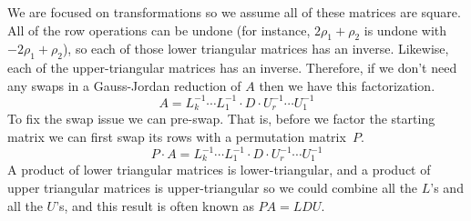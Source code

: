We are focused on transformations so we assume all of these
matrices are square.
All of the row operations can be undone (for instance, $2\rho_1+\rho_2$
is undone with $-2\rho_1+\rho_2$), so each of those lower triangular matrices
has an inverse.
Likewise, each of the upper-triangular matrices has an inverse.
Therefore, 
if we don't need any swaps in a Gauss-Jordan reduction of $A$ then we have
this factorization.
\begin{equation*} 
  A = L_k^{-1}\cdots L_1^{-1}\cdot D\cdot U_r^{-1}\cdots U_1^{-1}
\end{equation*}
To fix the swap issue we can pre-swap.
That is, before we factor the starting matrix we can first swap its rows
with a permutation matrix~$P$.
\begin{equation*}
  P\cdot A = L_k^{-1}\cdots L_1^{-1}\cdot D\cdot U_r^{-1}\cdots U_1^{-1}
  \tag{$**$}
\end{equation*}
A product of lower triangular matrices is lower-triangular,
and a product of upper triangular matrices is 
upper-triangular
so we could combine all the $L$'s and all the $U$'s, and
this result is often known as $PA=LDU$.

